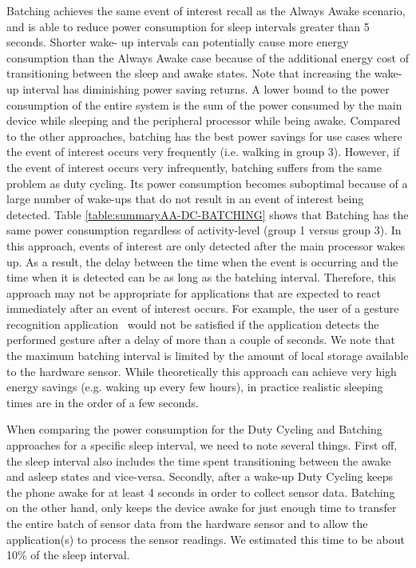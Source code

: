 Batching achieves the same event of interest recall as the Always Awake scenario, and is able to reduce power consumption for sleep intervals greater than 5 seconds. Shorter wake- 
up intervals can potentially cause more energy consumption than the Always Awake case because of the additional energy cost of transitioning between the sleep and awake states. 
Note that increasing the wake-up interval has diminishing power saving returns. A lower bound to the power consumption of the entire system is the sum of the power consumed by the 
main device while sleeping and the peripheral processor while being awake. Compared to the other approaches, batching has the best power savings for use cases where the event of 
interest occurs very frequently (i.e. walking in group 3). However, if the event of interest occurs very infrequently, batching suffers from the same problem as duty cycling. Its 
power consumption becomes suboptimal because of a large number of wake-ups that do not result in an event of interest being detected. Table \ref{table:summaryAA-DC-BATCHING} shows 
that Batching has the same power consumption regardless of activity-level (group 1 versus group 3). In this approach, events of interest are only detected after the main processor 
wakes up. As a result, the delay between the time when the event is occurring and the time when it is detected can be as long as the batching interval. Therefore, this approach 
may not be appropriate for applications that are expected to react immediately after an event of interest occurs. For example, the user of a gesture recognition application~\cite{
liu2009uwave,schlomer2008gesture} would not be satisfied if the application detects the performed gesture after a delay of more than a couple of seconds. We note that the maximum 
batching interval is limited by the amount of local storage available to the hardware sensor. While theoretically this approach can achieve very high energy savings (e.g. waking 
up every few hours), in practice realistic sleeping times are in the order of a few seconds.

When comparing the power consumption for the Duty Cycling and Batching approaches for a specific sleep interval, we need to note several things. First off, the sleep interval also 
includes the time spent transitioning between the awake and asleep states and vice-versa. Secondly, after a wake-up Duty Cycling keeps the phone awake for at least 4 seconds in 
order to collect sensor data. Batching on the other hand, only keeps the device awake for just enough time to transfer the entire batch of sensor data from the hardware sensor and 
to allow the application(s) to process the sensor readings. We estimated this time to be about 10\% of the sleep interval. 

